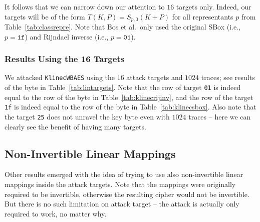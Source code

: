 It follows that we can narrow down our attention to $16$ targets only. Indeed, our targets will be of the form $T(K,P) = S_{p,0}(K+P)$ for all representants $p$ from Table~\ref{tab:classrepre}. Note that Bos et al.\ only used the original SBox (i.e., $p = \texttt{1f}$) and Rijndael inverse (i.e., $p = \texttt{01}$).

\subsubsection{Results Using the 16 Targets}
	
	We attacked {\tt KlinecWBAES} using the $16$ attack targets and $1024$ traces; see results of the  byte in Table~\ref{tab:lintargets}. Note that the row of target {\tt 01} is indeed equal to the row of the  byte in Table~\ref{tab:klinecrijinv}, and the row of the target {\tt 1f} is indeed equal to the row of the  byte in Table~\ref{tab:klinecsbox}. Also note that the target {\tt 25} does not unravel the  key byte even with $1024$ traces -- here we can clearly see the benefit of having many targets.
	



\subsection{Non-Invertible Linear Mappings}
\label{sec:noninv}

Other results emerged with the idea of trying to use also non-invertible linear mappings inside the attack targets. Note that the mappings were originally required to be invertible, otherwise the resulting cipher would not be invertible. But there is no such limitation on attack target -- the attack is actually only required to work, no matter why.

